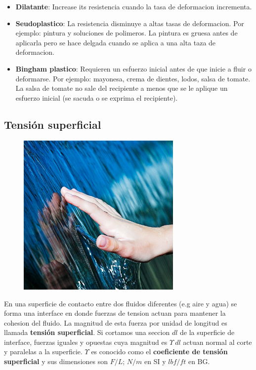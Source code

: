 \documentclass[10pt, oneside]{article}
\begin{document}
\begin{itemize}
\item \textbf{Dilatante}: Increase its resistencia cuando la tasa de deformacion incrementa.
\item \textbf{Seudoplastico}: La resistencia disminuye a altas tasas de deformacion. Por ejemplo: pintura y soluciones de polimeros. La pintura es gruesa antes de aplicarla pero se hace delgada cuando se aplica a una alta taza de deformacion.
\item \textbf{Bingham plastico}: Requieren un esfuerzo inicial antes de que inicie a fluir o deformarse. Por ejemplo: mayonesa, crema de dientes, lodos, salsa de tomate. La salsa de tomate no sale del recipiente a menos que se le aplique un esfuerzo inicial (se sacuda o se exprima el recipiente). 
\end{itemize}

\subsection{Tensi\'on superficial}

\begin{figure}[h]
\centering
\includegraphics[width=8cm]{SurfaceTension}
\end{figure}


En una superficie de contacto entre dos fluidos diferentes (e.g aire y agua) se forma una interface en donde fuerzas de tension actuan para mantener la cohesion del fluido. La magnitud de esta fuerza por unidad de longitud es llamada \textbf{tensi\'on superficial}. Si cortamos una seccion $dl$ de la superficie de interface, fuerzas iguales y opuestas cuya magnitud es $\Upsilon\ dl$ actuan normal al corte y paralelas a la superficie. $\Upsilon$ es conocido como el \textbf{coeficiente de tensi\'on superficial} y sus dimensiones  son ${F/L}$; $N/m$ en SI y $lbf/ft$ en BG.
\end{document}
